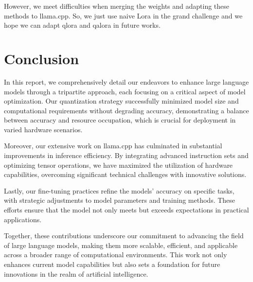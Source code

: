 \documentclass[conference]{IEEEtran}
\begin{document}
However, we meet difficulties when merging the weights and adapting these methods to llama.cpp. So, we just use naive Lora in the grand challenge and we hope we can adapt qlora and qalora in future works. 


\section{Conclusion}
In this report, we comprehensively detail our endeavors to enhance large language models through a tripartite approach, each focusing on a critical aspect of model optimization. Our quantization strategy successfully minimized model size and computational requirements without degrading accuracy, demonstrating a balance between accuracy and resource occupation, which is crucial for deployment in varied hardware scenarios.

Moreover, our extensive work on llama.cpp has culminated in substantial improvements in inference efficiency. By integrating advanced instruction sets and optimizing tensor operations, we have maximized the utilization of hardware capabilities, overcoming significant technical challenges with innovative solutions.

Lastly, our fine-tuning practices refine the models' accuracy on specific tasks, with strategic adjustments to model parameters and training methods. These efforts ensure that the model not only meets but exceeds expectations in practical applications.


Together, these contributions underscore our commitment to advancing the field of large language models, making them more scalable, efficient, and applicable across a broader range of computational environments. This work not only enhances current model capabilities but also sets a foundation for future innovations in the realm of artificial intelligence.


% 
\printbibliography{}
\end{document}
